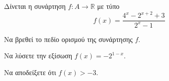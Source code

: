 Δίνεται η συνάρτηση $ f:A\to\mathbb{R} $ με τύπο 
\[ f(x)=\frac{4^x-2^{x+2}+3}{2^x-1} \]
\begin{rlist}
\item Να βρεθεί το πεδίο ορισμού της συνάρτησης $ f $.
\item Να λύσετε την εξίσωση $ f(x)=-2^{1-x} $.
\item Να αποδείξετε ότι $ f(x)>-3 $.
\end{rlist}